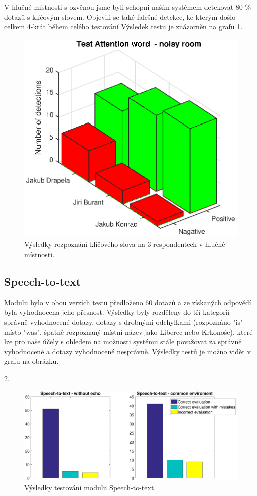 \documentclass[12pt,a4paper]{article}
\begin{document}
V hlučné místnosti s ozvěnou jsme byli schopni naším systémem detekovat 80 \% dotazů s klíčovým slovem. Objevili se také falešné detekce, ke kterým došlo celkem 4-krát během celého testování Výsledek testu je znázorněn na grafu \ref{fig:AttentionWord2}. 

	\begin{figure}[ht]
		
		\centering
		\includegraphics[width = 12cm]{AtWr_test2.eps}
		\caption{Výsledky rozpoznání klíčového slova na 3 respondentech v hlučné místnosti.}
		\label{fig:AttentionWord2}
	\end{figure}

\subsection{Speech-to-text}
Modulu bylo v obou verzích testu předloženo 60 dotazů a ze získaných odpovědí byla vyhodnocena jeho přesnost. Výsledky byly rozděleny do tří kategorií - správně vyhodnocené dotazy, dotazy s drobnými odchylkami (rozpoznáno "is" místo "was", špatně rozpoznaný místní název jako Liberec nebo Krkonoše), které lze pro naše účely s ohledem na možnosti systému stále považovat za správně vyhodnocené a dotazy vyhodnocené nesprávně.
Výsledky testů je možno vidět v grafu na obrázku.

 \ref{fig:speech}.
\begin{figure}[ht]
	\begin{center}
		\includegraphics[width = 1\textwidth ]{stt.eps}
		\caption{Výsledky testování modulu Speech-to-text.}
		\label{fig:speech}
	\end{center}
\end{figure}
\end{document}
